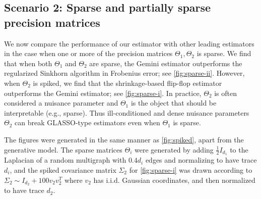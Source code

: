 \documentclass[aos]{imsart}
\theoremstyle{definition}
\numberwithin{equation}{section}
\begin{document}
\subsection{Scenario 2: Sparse and partially sparse precision matrices}
We now compare the performance of our estimator with other leading estimators in the case when one or more of the precision matrices $\Theta_1, \Theta_2$ is sparse. We find that when both $\Theta_1$ and $\Theta_2$ are sparse, the Gemini estimator outperforms the regularized Sinkhorn algorithm in Frobenius error; see \cref{fig:sparse-ii}. However, when $\Theta_2$ is spiked, we find that the shrinkage-based flip-flop estimator outperforms the Gemini estimator; see \cref{fig:sparse-i}. In practice, $\Theta_2$ is often considered a nuisance parameter and $\Theta_1$ is the object that should be interpretable (e.g., sparse). Thus ill-conditioned and dense nuisance parameters $\Theta_2$ can break GLASSO-type estimators even when $\Theta_1$ is sparse.

The figures were generated in the same manner as \cref{fig:spiked}, apart from the generative model. The sparse matrices $\Theta_i$ were generated by adding $\frac{1}{2}I_{d_1}$ to the Laplacian of a random multigraph with $0.4 d_i$ edges and normalizing to have trace $d_i$, and the spiked covariance matrix $\Sigma_2$ for \cref{fig:sparse-i} was drawn according to $\Sigma_2 \sim I_{d_2} + 100 v_2v_2^T$ where $v_2$ has i.i.d. Gaussian coordinates, and then normalized to have trace $d_2$.
\end{document}
